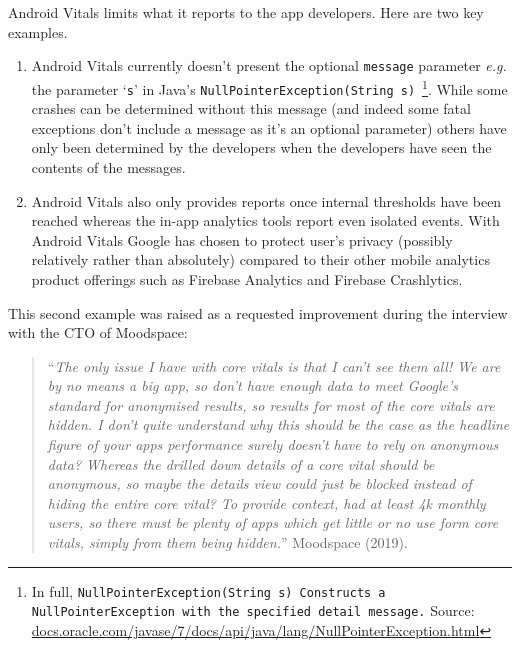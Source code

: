 Android Vitals limits what it reports to the app developers. Here are two key examples.

\begin{enumerate}
    \item Android Vitals currently doesn't present the optional \texttt{message} parameter \emph{e.g.} the parameter `\texttt{s}' in Java's \texttt{NullPointerException(String s)}~\footnote{In full, \texttt{NullPointerException(String s)
Constructs a NullPointerException with the specified detail message.} Source:  \href{https://docs.oracle.com/javase/7/docs/api/java/lang/NullPointerException.html}{docs.oracle.com/javase/7/docs/api/java/lang/NullPointerException.html}}. While some crashes can be determined without this message (and indeed some fatal exceptions don't include a message as it's an optional parameter) others have only been determined by the developers when the developers have seen the contents of the messages.
    \item Android Vitals also only provides reports once internal thresholds have been reached whereas the in-app analytics tools report even isolated events. With Android Vitals Google has chosen to protect user's privacy (possibly relatively rather than absolutely) compared to their other mobile analytics product offerings such as Firebase Analytics and Firebase Crashlytics.
\end{enumerate}

This second example was raised as a requested improvement during the interview with the CTO of Moodspace:
\begin{quote}
    ``\emph{The only issue I have with core vitals is that I can't see them all! We are by no means a big app, so don't have enough data to meet Google's standard for anonymised results, so results for most of the core vitals are hidden. I don't quite understand why this should be the case as the headline figure of your apps performance surely doesn't have to rely on anonymous data? Whereas the drilled down details of a core vital should be anonymous, so maybe the details view could just be blocked instead of hiding the entire core vital? To provide context,  had at least 4k monthly users, so there must be plenty of apps which get little or no use form core vitals, simply from them being hidden.}'' Moodspace (2019).
\end{quote}

